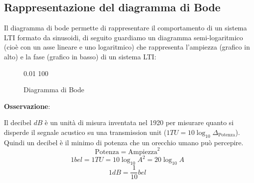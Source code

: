 \documentclass[a4paper]{article}
\begin{document}
\subsection{Rappresentazione del diagramma di Bode}
Il diagramma di bode permette di rappresentare il comportamento di un sistema LTI formato 
da sinusoidi, di seguito guardiamo un diagramma semi-logaritmico 
(cioè con un asse lineare e uno logaritmico) che rappresenta l'ampiezza (grafico in alto)
e la fase (grafico in basso) di un sistema LTI:
\begin{figure}[H]
  \centering
  {0.01}
  {100}
  \caption{Diagramma di Bode}
\end{figure}
\vspace{1em}
\noindent
\textbf{Osservazione}:

\noindent
  Il decibel \( dB \) è un unità di misura inventata nel 1920 per misurare quanto si
  disperde il segnale acustico su una transmission unit (\( 1TU = 10 \log_{10} \Delta_{\text{Potenza}} \)).
  Quindi un decibel è il minimo di potenza che un orecchio umano può percepire.
  \[
    \text{Potenza} = \text{Ampiezza}^2
  \] 
  \[
    1 bel = 1 TU = 10\log_{10} A^2 = 20 \log_{10} A
  \] 
  \[
    1 dB = \frac{1}{10} bel
  \] 
\end{document}
